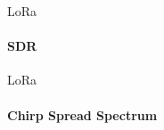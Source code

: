 \begin{frame}{LoRa}
\framesubtitle{SDR}
\begin{center}
\end{center}
\end{frame}

\begin{frame}{LoRa}
\framesubtitle{Chirp Spread Spectrum}
\begin{columns}
  \begin{column}{0.5\textwidth}
    
  \end{column}
  \begin{column}{0.5\textwidth}
    \begin{center}
    \end{center}
  \end{column}
\end{columns}
\end{frame}

